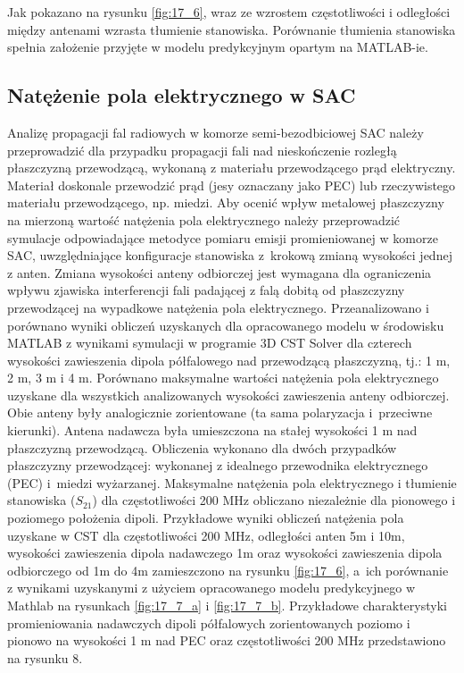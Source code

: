 Jak pokazano na rysunku \ref{fig:17_6}, wraz ze wzrostem częstotliwości i odległości między antenami wzrasta tłumienie stanowiska. Porównanie tłumienia stanowiska spełnia założenie przyjęte w modelu predykcyjnym opartym na MATLAB-ie.

\subsection[Natężenie pola \ldots]{Natężenie pola elektrycznego w SAC} 
\label{sec:17_wer_nat_polSAC}
Analizę propagacji fal radiowych w komorze semi-bezodbiciowej SAC należy przeprowadzić dla przypadku propagacji fali nad nieskończenie rozległą płaszczyzną przewodzącą, wykonaną z materiału przewodzącego prąd elektryczny. Materiał doskonale przewodzić prąd  (jesy oznaczany jako PEC) lub rzeczywistego materiału przewodzącego, np. miedzi. 
Aby ocenić wpływ metalowej płaszczyzny na mierzoną wartość natężenia pola elektrycznego należy przeprowadzić symulacje odpowiadające metodyce pomiaru emisji promieniowanej w komorze SAC, uwzględniające konfiguracje stanowiska z~krokową zmianą wysokości jednej z anten. Zmiana wysokości anteny odbiorczej jest wymagana dla ograniczenia wpływu zjawiska interferencji fali padającej z falą dobitą od płaszczyzny przewodzącej na wypadkowe natężenia pola elektrycznego. 
Przeanalizowano i porównano wyniki obliczeń uzyskanych dla opracowanego modelu w środowisku MATLAB z wynikami symulacji w programie 3D CST Solver dla czterech wysokości zawieszenia dipola półfalowego nad przewodzącą płaszczyzną, tj.: 1 m, 2 m, 3 m i 4 m. Porównano maksymalne wartości natężenia pola elektrycznego uzyskane dla wszystkich analizowanych wysokości zawieszenia anteny odbiorczej. Obie anteny były analogicznie zorientowane (ta sama polaryzacja i~przeciwne kierunki). Antena nadawcza była umieszczona na stałej wysokości 1 m nad płaszczyzną przewodzącą.
Obliczenia wykonano dla dwóch przypadków płaszczyzny przewodzącej: wykonanej z idealnego przewodnika elektrycznego (PEC) i~miedzi wyżarzanej. Maksymalne natężenia pola elektrycznego i tłumienie stanowiska ($S_{21}$) dla częstotliwości 200 MHz obliczano niezależnie dla pionowego i poziomego położenia dipoli. Przykładowe wyniki obliczeń natężenia pola uzyskane w CST dla częstotliwości 200 MHz, odległości anten 5m i 10m, wysokości zawieszenia dipola nadawczego 1m oraz wysokości zawieszenia dipola odbiorczego  od 1m do 4m zamieszczono na rysunku \ref{fig:17_6}, a~ich porównanie z wynikami uzyskanymi z użyciem opracowanego modelu predykcyjnego w Mathlab na rysunkach \ref{fig:17_7_a} i \ref{fig:17_7_b}.
Przykładowe charakterystyki promieniowania nadawczych dipoli półfalowych zorientowanych poziomo i pionowo na wysokości 1 m nad PEC oraz częstotliwości 200 MHz przedstawiono na rysunku 8.

